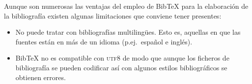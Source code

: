 \documentclass[11pt,a4paper]{article}
\begin{document}
Aunque son numerosas las ventajas del empleo de Bib\TeX{} para la elaboración de la bibliografía existen algunas limitaciones que conviene tener presentes:
\begin{itemize}
	\item No puede tratar con bibliografías multilingües. Esto es, aquellas en que las fuentes están en más de un idioma (p.ej.\ español e inglés).
	
	\item Bib\TeX{} no es compatible con \textsc{utf8} de modo que aunque los ficheros de bibliografía se pueden codificar así con algunos estilos bibliográficos se obtienen errores.
\end{itemize}





\renewcommand{\refname}{Bibliografía} %


%

%
% 

\nocite{*} %
\end{document}

